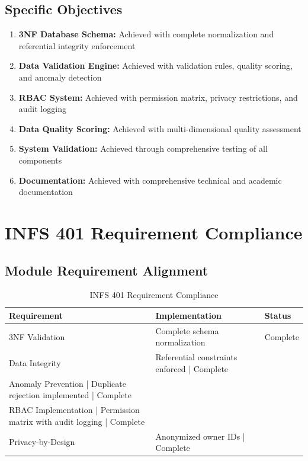 \subsection{Specific Objectives}

\begin{enumerate}
    \item \textbf{3NF Database Schema:} Achieved with complete normalization and referential integrity enforcement
    
    \item \textbf{Data Validation Engine:} Achieved with validation rules, quality scoring, and anomaly detection
    
    \item \textbf{RBAC System:} Achieved with permission matrix, privacy restrictions, and audit logging
    
    \item \textbf{Data Quality Scoring:} Achieved with multi-dimensional quality assessment
    
    \item \textbf{System Validation:} Achieved through comprehensive testing of all components
    
    \item \textbf{Documentation:} Achieved with comprehensive technical and academic documentation
\end{enumerate}

\section{INFS 401 Requirement Compliance}

\subsection{Module Requirement Alignment}

\begin{table}[H]
\centering
\begin{tabular}{|l|l|l|}
\hline
\textbf{Requirement} & \textbf{Implementation} & \textbf{Status} \\
\hline
3NF Validation & Complete schema normalization & Complete \\
Data Integrity & Referential constraints enforced | Complete \\
Anomaly Prevention | Duplicate rejection implemented | Complete \\
RBAC Implementation | Permission matrix with audit logging | Complete \\
Privacy-by-Design & Anonymized owner IDs | Complete \\
\hline
\end{tabular}
\caption{INFS 401 Requirement Compliance}
\end{table}

